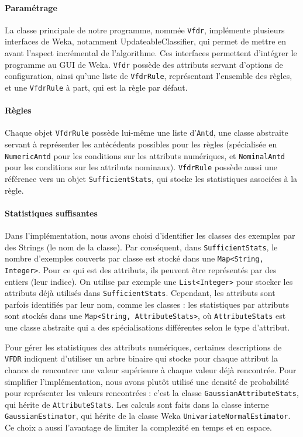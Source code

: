         \paragraph{Paramétrage} La classe principale de notre programme, nommée \texttt{Vfdr}, implémente plusieurs interfaces de Weka, notamment UpdateableClassifier, qui permet de mettre en avant l’aspect incrémental de l’algorithme. Ces interfaces permettent d'intégrer le programme au GUI de Weka. \texttt{Vfdr} possède des attributs servant d’options de configuration, ainsi qu’une liste de \texttt{VfdrRule}, représentant l’ensemble des règles, et une \texttt{VfdrRule} à part, qui est la règle par défaut.

        \paragraph{Règles}Chaque objet \texttt{VfdrRule} possède lui-même une liste d’\texttt{Antd}, une classe abstraite servant à représenter les antécédents possibles pour les règles (spécialisée en \texttt{NumericAntd} pour les conditions sur les attributs numériques, et \texttt{NominalAntd} pour les conditions sur les attributs nominaux). \texttt{VfdrRule} possède aussi une référence vers un objet \texttt{SufficientStats}, qui stocke les statistiques associées à la règle. 


        \paragraph{Statistiques suffisantes} 
            Dans l’implémentation, nous avons choisi d’identifier les classes des exemples par des Strings (le nom de la classe). Par conséquent, dans \texttt{SufficientStats}, le nombre d’exemples couverts par classe est stocké dans une \texttt{Map<String, Integer>}. Pour ce qui est des attributs, ils peuvent être représentés par des entiers (leur indice). On utilise par exemple une \texttt{List<Integer>} pour stocker les attributs déjà utilisés dans \texttt{SufficientStats}. Cependant, les attributs sont parfois identifiés par leur nom, comme les classes : les statistiques par attributs sont stockés dans une \texttt{Map<String, \texttt{AttributeStats}>}, où \texttt{AttributeStats} est une classe abstraite qui a des spécialisations différentes selon le type d’attribut.
            
            Pour gérer les statistiques des attributs numériques, certaines descriptions de \texttt{VFDR} indiquent d’utiliser un arbre binaire qui stocke pour chaque attribut la chance de rencontrer une valeur supérieure à chaque valeur déjà rencontrée. Pour simplifier l’implémentation, nous avons plutôt utilisé une densité de probabilité pour représenter les valeurs rencontrées : c’est la classe \texttt{GaussianAttributeStats}, qui hérite de \texttt{AttributeStats}. Les calculs sont faits dans la classe interne \texttt{GaussianEstimator}, qui hérite de la classe Weka \texttt{UnivariateNormalEstimator}. Ce choix a aussi l’avantage de limiter la complexité en temps et en espace.
        
